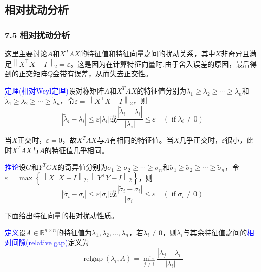 \documentclass[notheorems,serif]{beamer}
\begin{document}
\subsection*{相对扰动分析}
\begin{frame}
\frametitle{7.5 \qquad 相对扰动分析}


这里主要讨论$A$和$X^TAX$的特征值和特征向量之间的扰动关系，其中$X$非奇异且满足$\left\|X^{\top} X-I\right\|_{2}=\varepsilon$。这是因为在计算特征向量时,由于舍入误差的原因，最后得到的正交矩阵$Q$会带有误差，从而失去正交性。

\textcolor{blue}{定理(相对Weyl定理)}\quad 设对称矩阵$A$和$X^TAX$的特征值分别为$\lambda_{1} \geq \lambda_{2} \geq \cdots \geq \lambda_{n}$和$\tilde{\lambda}_{1} \geq \tilde{\lambda}_{2} \geq \cdots \geq \tilde{\lambda}_{n}$，令$\varepsilon=\left\|X^{\top} X-I\right\|_{2}$，则$$
\left|\tilde{\lambda}_{i}-\lambda_{i}\right| \leq \varepsilon\left|\lambda_{i}\right|
\text{或}\frac{\left|\tilde{\lambda}_{i}-\lambda_{i}\right|}{\left|\lambda_{i}\right|} \leq \varepsilon \quad\left(\text { if } \lambda_{i} \neq 0\right)$$

当$X$正交时，$\varepsilon=0$，故$X^TAX$与$A$有相同的特征值。当$X$几乎正交时，$\varepsilon$很小，此时$X^TAX$与$A$的特征值几乎相同。
\end{frame}
\begin{frame}

\textcolor{blue}{推论}\quad 设$G$和$Y^TGX$的奇异值分别为$\sigma_{1} \geq \sigma_{2} \geq \cdots \geq \sigma_{n}$和$\tilde{\sigma}_{1} \geq \tilde{\sigma}_{2} \geq \cdots \geq \tilde{\sigma}_{n}$，令$\varepsilon=\max \left\{\left\|X^{\top} X-I\right\|_{2},\left\|Y^{\top} Y-I\right\|_{2}\right\}$，则$$
\left|\tilde{\sigma}_{i}-\sigma_{i}\right| \leq \varepsilon\left|\sigma_{i}\right|
\text{或}\frac{\left|\tilde{\sigma}_{i}-\sigma_{i}\right|}{\left|\sigma_{i}\right|} \leq \varepsilon \quad\left(\text { if } \sigma_{i} \neq 0\right)
$$

下面给出特征向量的相对扰动性质。

\textcolor{blue}{定义}\quad 设$A \in \mathbb{R}^{n \times n}$的特征值为$\lambda_{1}, \lambda_{2}, \ldots, \lambda_{n}$，若$\lambda_{i}\neq 0$，则$\lambda_{i}$与其余特征值之间的\textcolor{blue}{相对间隙(relative gap)}定义为$$
\operatorname{relgap}\left(\lambda_{i}, A\right)=\min _{j \neq i} \frac{\left|\lambda_{j}-\lambda_{i}\right|}{\left|\lambda_{i}\right|}
$$
\end{frame}
\end{document}
